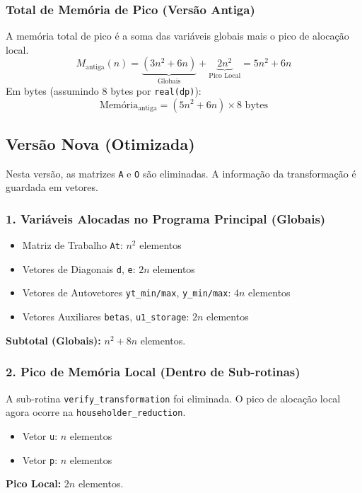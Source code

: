 \documentclass[12pt, a4paper]{article} %
\begin{document}
            \subsubsection*{Total de Mem\'oria de Pico (Vers\~ao Antiga)}
            A mem\'oria total de pico \'e a soma das vari\'aveis globais mais o pico de aloca\c{c}\~ao local.
            \[
            M_{\text{antiga}}(n) = \underbrace{(3n^2 + 6n)}_{\text{Globais}} + \underbrace{2n^2}_{\text{Pico Local}} = 5n^2 + 6n
            \]
            Em bytes (assumindo 8 bytes por \texttt{real(dp)}):
            \[
            \text{Mem\'oria}_{\text{antiga}} = (5n^2 + 6n) \times 8 \text{ bytes}
            \]

            \subsection*{Vers\~ao Nova (Otimizada)}

            Nesta vers\~ao, as matrizes \texttt{A} e \texttt{O} s\~ao eliminadas. A informa\c{c}\~ao da transforma\c{c}\~ao \'e guardada em vetores.

            \subsubsection*{1. Vari\'aveis Alocadas no Programa Principal (Globais)}
            \begin{itemize}
                \item Matriz de Trabalho \texttt{At}: $n^2$ elementos
                \item Vetores de Diagonais \texttt{d}, \texttt{e}: $2n$ elementos
                \item Vetores de Autovetores \texttt{yt\_min/max}, \texttt{y\_min/max}: $4n$ elementos
                \item Vetores Auxiliares \texttt{betas}, \texttt{u1\_storage}: $2n$ elementos
            \end{itemize}
            \textbf{Subtotal (Globais):} $n^2 + 8n$ elementos.

            \subsubsection*{2. Pico de Mem\'oria Local (Dentro de Sub-rotinas)}
            A sub-rotina \texttt{verify\_transformation} foi eliminada. O pico de aloca\c{c}\~ao local agora ocorre na \texttt{householder\_reduction}.
            \begin{itemize}
                \item Vetor \texttt{u}: $n$ elementos
                \item Vetor \texttt{p}: $n$ elementos
            \end{itemize}
            \textbf{Pico Local:} $2n$ elementos.
\end{document}
